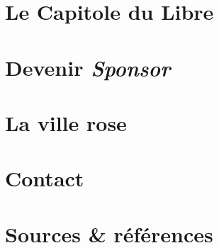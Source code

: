 \documentclass{cdl_sponsor}
\begin{document}
	

\section{Le Capitole du Libre}

	

\section{Devenir \textit{Sponsor}}

	

\section{La ville rose}

	
	
\section{Contact}

	

\section{Sources \& références}

	
\end{document}
